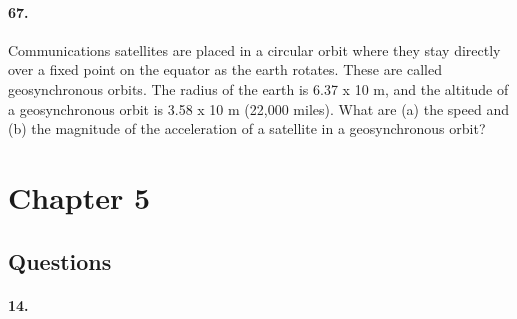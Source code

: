     \paragraph*{67.}
    Communications satellites are placed in a circular orbit where they stay directly over a fixed point on the equator as the earth rotates. These are called geosynchronous orbits. The radius of the earth is 6.37 x 10 m, and the altitude of a geosynchronous orbit is 3.58 x 10 m (22,000 miles). What are (a) the speed and (b) the magnitude of the acceleration of a satellite in a geosynchronous orbit?

    \section*{Chapter 5}
    \subsection*{Questions}
    \paragraph*{14.}
    

